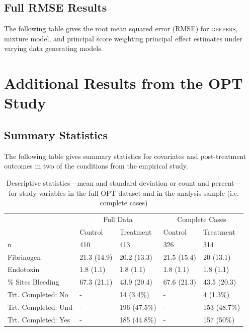 \documentclass[]{article}
\begin{document}



\clearpage
\subsection{Full RMSE Results}
The following table gives the root mean squared error (RMSE) for \textsc{geepers}, mixture model, and principal score weighting principal effect estimates under varying data generating models.\\



\clearpage


\section{Additional Results from the OPT Study}
\singlespacing
\subsection{Summary Statistics}
The following table gives summary statistics for covariates and post-treatment outcomes in two of the conditions from the empirical study.\\

\begin{table}

\caption{\label{tab:tab:optTab1}Descriptive statistics---mean and standard deviation or count and percent---for study variables in the full OPT dataset and in the analysis sample (i.e. complete cases)}
\centering
\begin{tabular}[t]{lllll}
\toprule
\multicolumn{1}{c}{ } & \multicolumn{2}{c}{Full Data} & \multicolumn{2}{c}{Complete Cases} \\
\cmidrule(l{3pt}r{3pt}){2-3} \cmidrule(l{3pt}r{3pt}){4-5}
  & Control & Treatment & Control & Treatment\\
\midrule
n & 410 & 413 & 326 & 314\\
Fibrinogen & 21.3 (14.9) & 20.2 (13.3) & 21.5 (15.4) & 20 (13.1)\\
Endotoxin & 1.8 (1.1) & 1.8 (1.1) & 1.8 (1.1) & 1.8 (1.1)\\
\% Sites Bleeding & 67.3 (21.1) & 43.9 (20.4) & 67.6 (21.3) & 43.5 (20.3)\\
Trt. Completed: No & - & 14 (3.4\%) & - & 4 (1.3\%)\\
\addlinespace
Trt. Completed: Und & - & 196 (47.5\%) & - & 153 (48.7\%)\\
Trt. Completed: Yes & - & 185 (44.8\%) & - & 157 (50\%)\\
\bottomrule
\end{tabular}
\end{table}
\end{document}
